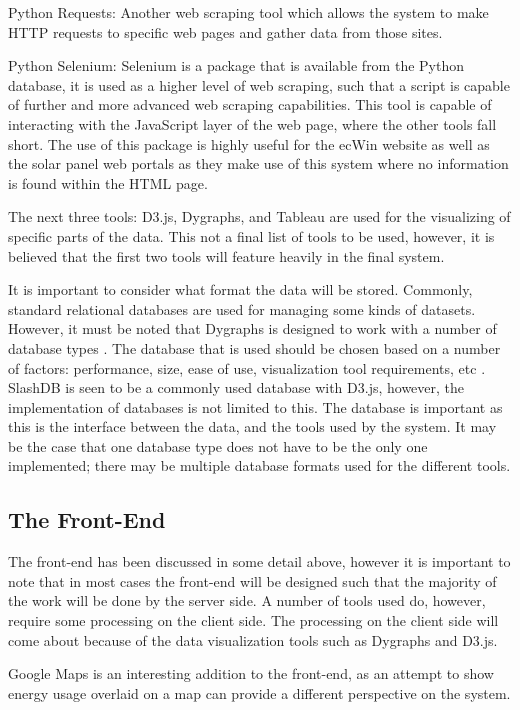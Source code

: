 \documentclass[12pt,onecolumn]{IEEEtran}
\begin{document}
Python Requests: Another web scraping tool which allows the system to make HTTP requests to specific web pages and gather data from those sites. 

Python Selenium: Selenium is a package that is available from the Python database, it is used as a higher level of web scraping, such that a script is capable of further and more advanced web scraping capabilities. This tool is capable of interacting with the JavaScript layer of the web page, where the other tools fall short. The use of this package is highly useful for the ecWin website as well as the solar panel web portals as they make use of this system where no information is found within the HTML page.

The next three tools: D3.js, Dygraphs, and Tableau are used for the visualizing of specific parts of the data. This not a final list of tools to be used, however, it is believed that the first two tools will feature heavily in the final system.

It is important to consider what format the data will be stored. Commonly, standard relational databases are used for managing some kinds of datasets. However, it must be noted that Dygraphs is designed to work with a number of database types \cite{dygraphs_data}. The database that is used should be chosen based on a number of factors: performance, size, ease of use, visualization tool requirements, etc \cite{database}. SlashDB is seen to be a commonly used database with D3.js, however, the implementation of databases is not limited to this.
The database is important as this is the interface between the data, and the tools used by the system. It may be the case that one database type does not have to be the only one implemented; there may be multiple database formats used for the different tools.

\subsection{The Front-End} \label{sec:TheFrontEnd}
The front-end has been discussed in some detail above, however it is important to note that in most cases the front-end will be designed such that the majority of the work will be done by the server side. A number of tools used do, however, require some processing on the client side. The processing on the client side will come about because of the data visualization tools such as Dygraphs and D3.js. 

Google Maps is an interesting addition to the front-end, as an attempt to show energy usage overlaid on a map can provide a different perspective on the system.
\end{document}
